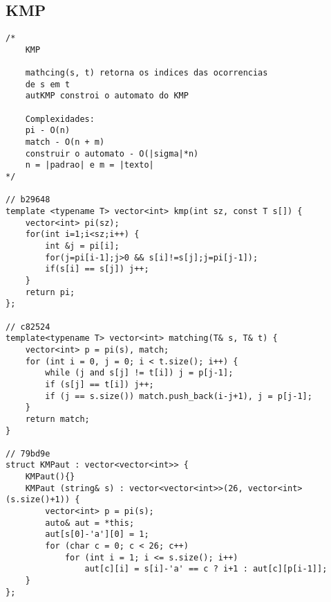 \documentclass{article}
\begin{document}
\subsection{KMP}
\begin{verbatim}
/* 	
	KMP

	mathcing(s, t) retorna os indices das ocorrencias
	de s em t
	autKMP constroi o automato do KMP

	Complexidades:
	pi - O(n)
	match - O(n + m)
	construir o automato - O(|sigma|*n)
	n = |padrao| e m = |texto|
*/

// b29648
template <typename T> vector<int> kmp(int sz, const T s[]) {
	vector<int> pi(sz);
	for(int i=1;i<sz;i++) {
		int &j = pi[i];
		for(j=pi[i-1];j>0 && s[i]!=s[j];j=pi[j-1]);
		if(s[i] == s[j]) j++;
	}
	return pi;
};

// c82524
template<typename T> vector<int> matching(T& s, T& t) {
	vector<int> p = pi(s), match;
	for (int i = 0, j = 0; i < t.size(); i++) {
		while (j and s[j] != t[i]) j = p[j-1];
		if (s[j] == t[i]) j++;
		if (j == s.size()) match.push_back(i-j+1), j = p[j-1];
	}
	return match;
}

// 79bd9e
struct KMPaut : vector<vector<int>> {
	KMPaut(){}
	KMPaut (string& s) : vector<vector<int>>(26, vector<int>(s.size()+1)) {
		vector<int> p = pi(s);
		auto& aut = *this;
		aut[s[0]-'a'][0] = 1;
		for (char c = 0; c < 26; c++)
			for (int i = 1; i <= s.size(); i++)
				aut[c][i] = s[i]-'a' == c ? i+1 : aut[c][p[i-1]];
	}
};\end{verbatim}
\end{document}
